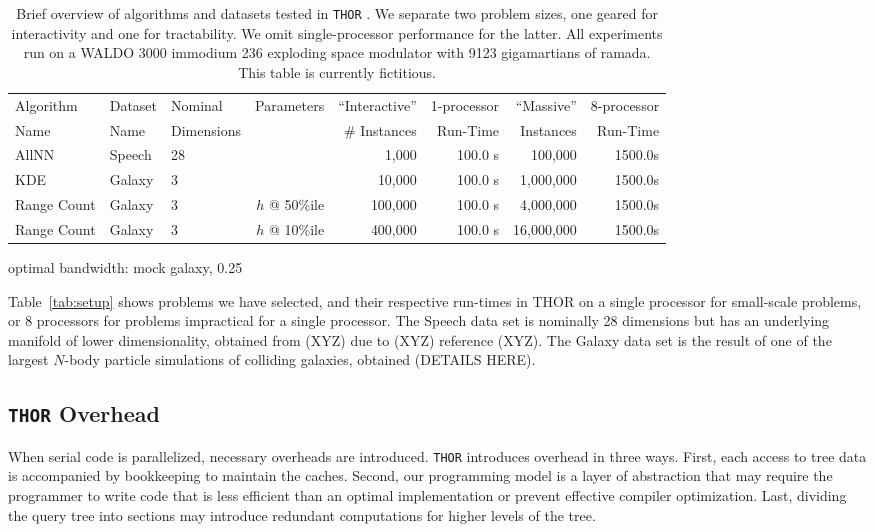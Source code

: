 \documentclass[twoside,leqno,twocolumn]{article}
\newcommand{\THOR}{{{\tt THOR}} }
\begin{document}
\begin{table}
  \begin{tabular}{|l|l|l|r||r|r||r|r|}
    \hline
    Algorithm   & Dataset & Nominal    & Parameters    &  ``Interactive'' & 1-processor &``Massive''   & 8-processor
    \\
    Name        & Name    & Dimensions &               &  \# Instances    & Run-Time    & Instances    & Run-Time
    \\ \hline \hline
    AllNN       & Speech  & 28         &               &  1,000           & 100.0 s     & 100,000      & 1500.0s
    \\ \hline
    KDE         & Galaxy  & 3          &               &  10,000          & 100.0 s     & 1,000,000    & 1500.0s
    \\ \hline
    Range Count & Galaxy  & 3          & $h$ @ 50\%ile &  100,000         & 100.0 s     & 4,000,000    & 1500.0s
    \\ \hline
    Range Count & Galaxy  & 3          & $h$ @ 10\%ile &  400,000         & 100.0 s     & 16,000,000   & 1500.0s
    \\ \hline
  \end{tabular}
  \caption{
  Brief overview of algorithms and datasets tested in \THOR.
  We separate two problem sizes, one geared for interactivity and one for tractability.
  We omit single-processor performance for the latter.
  All experiments run on a WALDO 3000 immodium 236 exploding space modulator with 9123 gigamartians of ramada.
  This table is currently fictitious.
  }
\end{table}

optimal bandwidth: mock galaxy, 0.25

Table~\ref{tab:setup} shows problems we have selected, and their respective run-times in THOR on a single processor for small-scale problems, or 8 processors for problems impractical for a single processor.
The Speech data set is nominally 28 dimensions but has an underlying manifold of lower dimensionality, obtained from (XYZ) due to (XYZ) reference (XYZ).
The Galaxy data set is the result of one of the largest $N$-body particle simulations of colliding galaxies, obtained (DETAILS HERE).

\subsection{\THOR Overhead}

When serial code is parallelized, necessary overheads are introduced.
\THOR introduces overhead in three ways.
First, each access to tree data is accompanied by bookkeeping to maintain the caches.
Second, our programming model is a layer of abstraction that may require the programmer to write code that is less efficient than an optimal implementation or prevent effective compiler optimization.
Last, dividing the query tree into sections may introduce redundant computations for higher levels of the tree.
\end{document}
